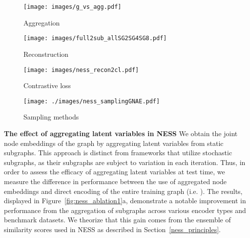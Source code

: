 \documentclass{article}
\begin{document}
\begin{figure*}[h]
\vskip 0.2in
\begin{center}
     \begin{subfigure}[c]{0.22\textwidth}
         \texttt{[image: images/g\_vs\_agg.pdf]}
         \caption{Aggregation}
     \end{subfigure}
     \begin{subfigure}[c]{0.22\textwidth}
         \texttt{[image: images/full2sub\_allSG2SG4SG8.pdf]}
         \caption{Reconstruction}
     \end{subfigure}
     \begin{subfigure}[c]{0.22\textwidth}
         \texttt{[image: images/ness\_recon2cl.pdf]}
         \caption{Contrastive loss}
     \end{subfigure}
     \begin{subfigure}[c]{0.31\textwidth}
         \texttt{[image: ./images/ness\_samplingGNAE.pdf]}
         \caption{Sampling methods}
     \end{subfigure}
\caption{Experiments with NESS: \textbf{a)} The difference in AUC scores (\%) obtained in two ways for NESS2: i) Aggregating the latent variables of static subgraphs i.e. , (our default case), ii) Getting the latent variable of the entire graph directly i.e.  at test time. The aggregation performs better across all models and datasets; The difference in AUC scores (\%) when: \textbf{b)} we reconstruct subgraphs rather than full graph. \textbf{c)} we use contrastive and reconstruction loss rather than only reconstruction loss. \textbf{d)} comparing NESS2 to other sampling strategies.}\label{fig:ness_ablation1}
\end{center}
\vskip -0.2in
\end{figure*}

\textbf{The effect of aggregating latent variables in NESS}
We obtain the joint node embeddings of the graph by aggregating latent variables from static subgraphs. This approach is distinct from frameworks that utilize stochastic subgraphs, as their subgraphs are subject to variation in each iteration. Thus, in order to assess the efficacy of aggregating latent variables at test time, we measure the difference in performance between the use of aggregated node embeddings and direct encoding of the entire training graph (i.e. ). The results, displayed in Figure~\ref{fig:ness_ablation1}a, demonstrate a notable improvement in performance from the aggregation of subgraphs across various encoder types and benchmark datasets. We theorize that this gain comes from the ensemble of similarity scores used in NESS as described in Section~\ref{ness_principles}.
\end{document}
